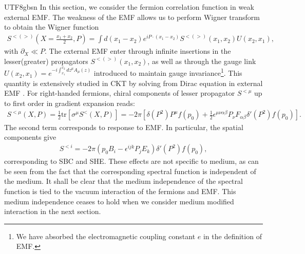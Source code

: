 \documentclass[11pt]{article}\def\baselinestretch{1.4}
\def\d{{\delta}}
\def\e{{\epsilon}}
\def\p{{\pi}}
\def\m{{\mu}}
\def\s{{\sigma}}
\newcommand{\pd}{{\partial}}
\newcommand{\tr}{\text{tr}}
\begin{document}
\begin{CJK}{UTF8}{gbsn}
In this section, we consider the fermion correlation function in weak external EMF. The weakness of the EMF allows us to perform Wigner transform to obtain the Wigner function
\begin{align}
    S^{<(>)}(X=\frac{x_1+x_2}{2}, P)= \int d(x_1-x_2) e^{i P \cdot (x_1-x_2)}S^{<(>)}(x_1,x_2)U(x_2,x_1),
\end{align}
with $\pd_X\ll P$. The external EMF enter through infinite insertions in the lesser(greater) propagators $S^{<(>)}(x_1,x_2)$, as well as through the gauge link $U(x_2,x_1)=e^{-i\int_{x_1}^{x_2} dz^\m A_\m(z)}$ introduced to maintain gauge invariance\footnote{We have absorbed the electromagnetic coupling constant $e$ in the definition of EMF.}. This quantity is extensively studied in CKT by solving from Dirac equation in external EMF \cite{Hidaka:2016yjf, Hidaka:2017auj}. For right-handed fermions, chiral components of lesser propagator $S^{<\mu}$ up to first order in gradient expansion reads:
\begin{align}\label{Sless_CKT}
    S^{<\mu }(X, P)=\frac{1}{2}\tr[\s^\m S^<(X,P)] = -2\pi \left[\delta (P^2)P^\mu f(p_0) + \frac{1}{2}\epsilon^{\mu \nu \alpha \beta }P_\nu F_{\alpha \beta }\delta '(P^2) f(p_0) \right].
\end{align}
The second term corresponds to response to EMF. In particular, the spatial components give
\begin{align}
    S^{<i}=-2\p (p_0B_i-\e^{ijk}P_jE_k)\d'(P^2)f(p_0),
\end{align}
corresponding to SBC and SHE. These effects are not specific to medium, as can be seen from the fact that the corresponding spectral function is independent of the medium. It shall be clear that the medium independence of the spectral function is tied to the vacuum interaction of the fermions and EMF. This medium independence ceases to hold when we consider medium modified interaction in the next section.


\end{CJK}
\end{document}
